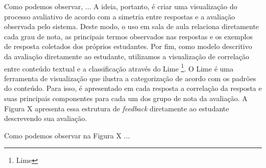 
Como podemos observar, ... A ideia, portanto, é criar uma visualização do processo avaliativo de acordo com a simetria entre respostas e a avaliação observada pelo sistema. Deste modo, o uso em sala de aula relaciona diretamente cada grau de nota, as principais termos observados nas respostas e os exemplos de resposta coletados dos próprios estudantes. Por fim, como modelo descritivo da avaliação diretamente ao estudante, utilizamos a visualização de correlação entre conteúdo textual e a classificação através do Lime \footnote{Lime}. O Lime é uma ferramenta de visualização que ilustra a categorização de acordo com os padrões do conteúdo. Para isso, é apresentado em cada resposta a correlação da resposta e suas principais componentes para cada um dos grupo de nota da avaliação. A Figura X apresenta essa estrutura de \textit{feedback} diretamente ao estudante descrevendo sua avaliação.


Como podemos observar na Figura X ...
